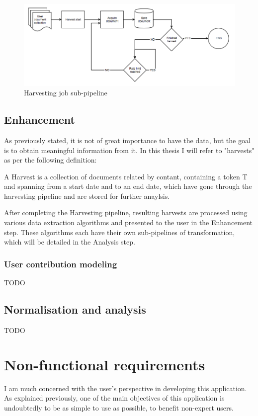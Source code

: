 \documentclass[12pt,a4paper,twoside]{report}
\begin{document}
\begin{figure}[ht]
    \centering
\includegraphics[width=\columnwidth]{img/harvestpipe.png}
    \caption{Harvesting job sub-pipeline}
    \label{fig:harvestpipe}
\end{figure}

\subsection{Enhancement}
As previously stated, it is not of great importance to have the data, but the goal is to obtain meaningful information from it. In this thesis I will refer to "harvests" as per the following definition:

\begin{definition}{}
A Harvest is a collection of documents related by contant, containing a token T and spanning from a start date and to an end date, which have gone through the harvesting pipeline and are stored for further anaylsis.
\end{definition}

After completing the Harvesting pipeline, resulting harvests are processed using various data extraction algorithms and presented to the user in the Enhancement step. These algorithms each have their own sub-pipelines of transformation, which will be detailed in the Analysis step.

\subsubsection{User contribution modeling}
{\color{red} TODO
}

\subsection{Normalisation and analysis}
{\color{red} TODO
}

\section{Non-functional requirements}
I am much concerned with the user's perspective in developing this application. As explained previously, one of the main objectives of this application is undoubtedly to be as simple to use as possible, to benefit non-expert users.
\end{document}
